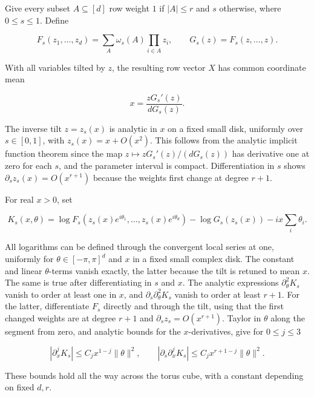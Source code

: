 \documentclass[11pt]{article}
\begin{document}
Give every subset $A\subseteq[d]$ row weight $1$ if $|A|\le r$ and $s$ otherwise, where $0\le s\le1$. Define

\begin{equation*}
F_s(z_1,\ldots,z_d)=\sum_A \omega_s(A)\prod_{i\in A}z_i, \qquad
G_s(z)=F_s(z,\ldots,z).
\end{equation*}

With all variables tilted by $z$, the resulting row vector $X$ has common coordinate mean

\begin{equation*}
x=\frac{zG_s'(z)}{dG_s(z)}.
\end{equation*}

The inverse tilt $z=z_s(x)$ is analytic in $x$ on a fixed small disk, uniformly over $s\in[0,1]$, with $z_s(x)=x+O(x^2)$. This follows from the analytic implicit function theorem since the map $z\mapsto zG_s'(z)/(dG_s(z))$ has derivative one at zero for each $s$, and the parameter interval is compact. Differentiation in $s$ shows $\partial_s z_s(x)=O(x^{r+1})$ because the weights first change at degree $r+1$.

For real $x>0$, set

\begin{equation*}
K_s(x,\theta)=
\log F_s(z_s(x)e^{i\theta_1},\ldots,z_s(x)e^{i\theta_d})
-\log G_s(z_s(x))-ix\sum_i\theta_i .
\end{equation*}

All logarithms can be defined through the convergent local series at one, uniformly for $\theta\in[-\pi,\pi]^d$ and $x$ in a fixed small complex disk. The constant and linear $\theta$-terms vanish exactly, the latter because the tilt is retuned to mean $x$. The same is true after differentiating in $s$ and $x$. The analytic expressions $\partial_\theta^2 K_s$ vanish to order at least one in $x$, and $\partial_s\partial_\theta^2K_s$ vanish to order at least $r+1$. For the latter, differentiate $F_s$ directly and through the tilt, using that the first changed weights are at degree $r+1$ and $\partial_s z_s=O(x^{r+1})$. Taylor in $\theta$ along the segment from zero, and analytic bounds for the $x$-derivatives, give for $0\le j\le3$

\begin{equation*}
|\partial_x^jK_s|\le C_j x^{1-j}\lVert \theta\rVert ^2, \qquad
|\partial_s\partial_x^j K_s|\le C_j x^{r+1-j}\lVert \theta\rVert ^2 .
\end{equation*}

These bounds hold all the way across the torus cube, with a constant depending on fixed $d,r$.
\end{document}

